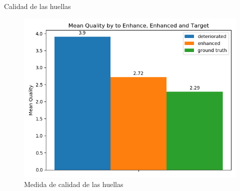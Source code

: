 \documentclass[12pt,aspectratio=169]{beamer}
\begin{document}
\begin{frame}{Calidad de las huellas}

    \begin{figure}
        \includegraphics[scale=0.54]{figs/mean_qualities.png}
        \caption{Medida de calidad de las huellas}
    \end{figure}
    
\end{frame}
\end{document}
